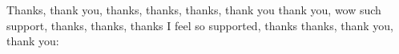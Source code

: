 Thanks, thank you, thanks, thanks, thanks, thank you thank you, wow such support, thanks, thanks, thanks I feel so supported, thanks thanks, thank you, thank you: 

